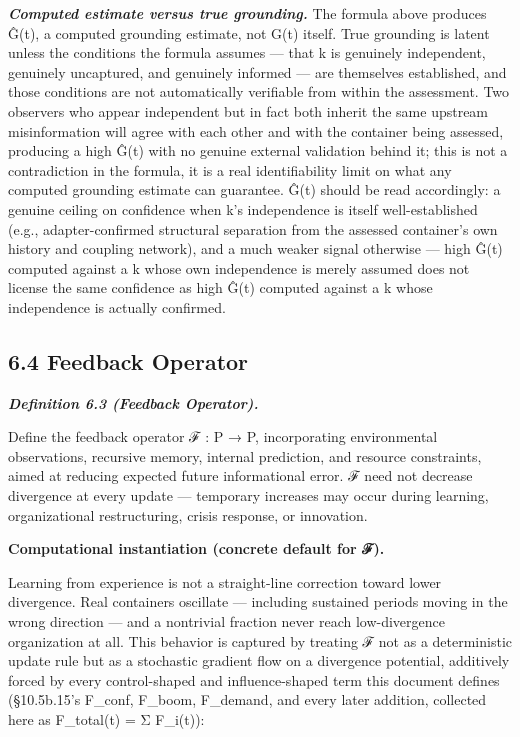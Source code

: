 \documentclass[
]{article}
\begin{document}
\emph{\textbf{Computed estimate versus true grounding.}} The formula
above produces Ĝ(t), a computed grounding estimate, not G(t) itself.
True grounding is latent unless the conditions the formula assumes ---
that k is genuinely independent, genuinely uncaptured, and genuinely
informed --- are themselves established, and those conditions are not
automatically verifiable from within the assessment. Two observers who
appear independent but in fact both inherit the same upstream
misinformation will agree with each other and with the container being
assessed, producing a high Ĝ(t) with no genuine external validation
behind it; this is not a contradiction in the formula, it is a real
identifiability limit on what any computed grounding estimate can
guarantee. Ĝ(t) should be read accordingly: a genuine ceiling on
confidence when k's independence is itself well-established (e.g.,
adapter-confirmed structural separation from the assessed container's
own history and coupling network), and a much weaker signal otherwise
--- high Ĝ(t) computed against a k whose own independence is merely
assumed does not license the same confidence as high Ĝ(t) computed
against a k whose independence is actually confirmed.

\hypertarget{feedback-operator}{%
\subsection{6.4 Feedback Operator}\label{feedback-operator}}

\emph{\textbf{Definition 6.3 (Feedback Operator).}}

Define the feedback operator ℱ : P → P, incorporating environmental
observations, recursive memory, internal prediction, and resource
constraints, aimed at reducing expected future informational error. ℱ
need not decrease divergence at every update --- temporary increases may
occur during learning, organizational restructuring, crisis response, or
innovation.

\textbf{Computational instantiation (concrete default for ℱ).}

Learning from experience is not a straight-line correction toward lower
divergence. Real containers oscillate --- including sustained periods
moving in the wrong direction --- and a nontrivial fraction never reach
low-divergence organization at all. This behavior is captured by
treating ℱ not as a deterministic update rule but as a stochastic
gradient flow on a divergence potential, additively forced by every
control-shaped and influence-shaped term this document defines
(§10.5b.15's F\_conf, F\_boom, F\_demand, and every later addition,
collected here as F\_total(t) = Σ F\_i(t)):
\end{document}
